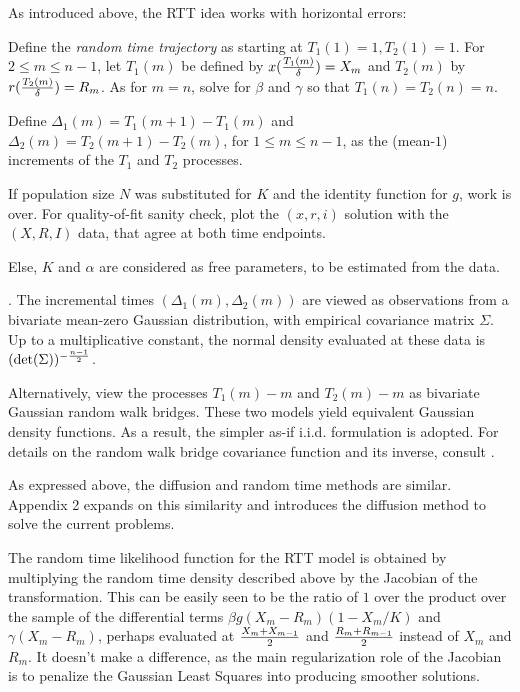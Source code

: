 \documentclass{article}
\begin{document}
As introduced above, the RTT idea works with horizontal errors:

\bigskip
Define the {\em random time trajectory} as starting at $T_1(1)=1, T_2(1)=1$. For $2 \le m \le n-1$, let $T_1(m)$ be defined by $x({{T_1(m)} \over \delta}) = X_m$ and $T_2(m)$ by $r({{T_2(m)} \over \delta}) = R_m$. As for $m=n$, solve for $\beta$ and $\gamma$ so that $T_1(n)=T_2(n)=n$.

Define $\Delta_1(m)=T_1(m+1)-T_1(m)$ and $\Delta_2(m)=T_2(m+1)-T_2(m)$, for $1 \le m \le n-1$, as the (mean-$1$) increments of the $T_1$ and $T_2$ processes.

\bigskip

If population size $N$ was substituted for $K$ and the identity function for $g$, work is over. For quality-of-fit sanity check, plot the $(x,r,i)$ solution with the $(X,R,I)$ data, that agree at both time endpoints.

Else, $K$ and $\alpha$ are considered as free parameters, to be estimated from the data.

\bigskip

. The incremental times $(\Delta_1(m),\Delta_2(m))$ are viewed
as observations from a bivariate mean-zero Gaussian distribution, with empirical covariance matrix $\Sigma$. Up to a multiplicative constant, the normal density evaluated at these data is $(\det(\Sigma))^{-{{n-1} \over 2}}$.

Alternatively, view the processes $T_1(m)-m$ and $T_2(m)-m$ as bivariate Gaussian random walk bridges.
These two models yield equivalent Gaussian density functions. As a result, the simpler as-if i.i.d. formulation is adopted. For details on the random walk bridge covariance function and its inverse, consult \cite{Cuadras}.

As expressed above, the diffusion and random time methods are similar. Appendix 2 expands on this similarity and introduces the diffusion method to solve the current problems.

\bigskip

The random time likelihood function for the RTT model is obtained by multiplying the random time density described above by the Jacobian of the transformation. This can be easily seen to be the ratio of $1$ over the product over the sample of the differential terms $\beta g(X_m-R_m)(1-X_m/K)$ and $\gamma (X_m-R_m)$, perhaps evaluated at
${{X_m+X_{m-1}} \over 2}$ and ${{R_m+R_{m-1}} \over 2}$ instead of $X_m$ and $R_m$. It doesn't make a difference, as the main regularization role of the Jacobian is to penalize the Gaussian Least Squares into producing smoother solutions.
\end{document}
